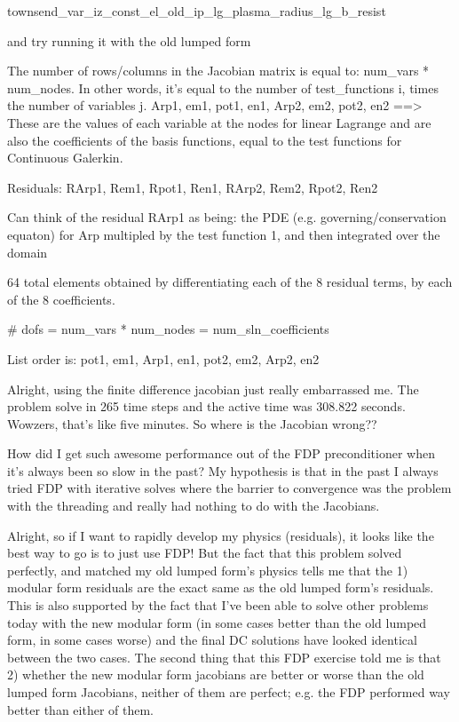 {townsend_var_iz_const_el_old_ip_lg_plasma_radius_lg_b_resist

and try running it with the old lumped form

The number of rows/columns in the Jacobian matrix is equal to: num_vars * num_nodes. In other words, it's equal to the number of test_functions i, times the number of variables j. Arp1, em1, pot1, en1, Arp2, em2, pot2, en2 ==> These are the values of each variable at the nodes for linear Lagrange and are also the coefficients of the basis functions, equal to the test functions for Continuous Galerkin.

Residuals: RArp1, Rem1, Rpot1, Ren1, RArp2, Rem2, Rpot2, Ren2

Can think of the residual RArp1 as being: the PDE (e.g. governing/conservation equaton) for Arp multipled by the test function 1, and then integrated over the domain

64 total elements obtained by differentiating each of the 8 residual terms, by each of the 8 coefficients.

# dofs = num_vars * num_nodes = num_sln_coefficients

List order is: pot1, em1, Arp1, en1, pot2, em2, Arp2, en2

Alright, using the finite difference jacobian just really embarrassed me. The problem solve in 265 time steps and the active time was 308.822 seconds. Wowzers, that's like five minutes. So where is the Jacobian wrong??

How did I get such awesome performance out of the FDP preconditioner when it's always been so slow in the past? My hypothesis is that in the past I always tried FDP with iterative solves where the barrier to convergence was the problem with the threading and really had nothing to do with the Jacobians.

Alright, so if I want to rapidly develop my physics (residuals), it looks like the best way to go is to just use FDP! But the fact that this problem solved perfectly, and matched my old lumped form's physics tells me that the 1) modular form residuals are the exact same as the old lumped form's residuals. This is also supported by the fact that I've been able to solve other problems today with the new modular form (in some cases better than the old lumped form, in some cases worse) and the final DC solutions have looked identical between the two cases. The second thing that this FDP exercise told me is that 2) whether the new modular form jacobians are better or worse than the old lumped form Jacobians, neither of them are perfect; e.g. the FDP performed way better than either of them.

}
